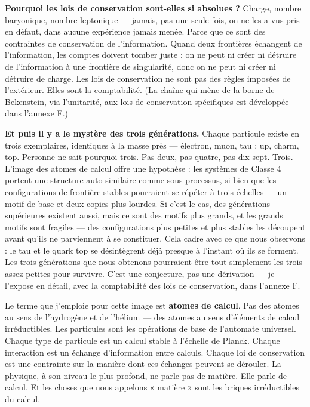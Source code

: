 \documentclass[11pt, twoside, openright]{book}
\begin{document}
\textbf{Pourquoi les lois de conservation sont-elles si absolues ?} Charge, nombre baryonique, nombre leptonique --- jamais, pas une seule fois, on ne les a vus pris en défaut, dans aucune expérience jamais menée. Parce que ce sont des contraintes de conservation de l'information. Quand deux frontières échangent de l'information, les comptes doivent tomber juste : on ne peut ni créer ni détruire de l'information à une frontière de singularité, donc on ne peut ni créer ni détruire de charge. Les lois de conservation ne sont pas des règles imposées de l'extérieur. Elles sont la comptabilité. (La chaîne qui mène de la borne de Bekenstein, via l'unitarité, aux lois de conservation spécifiques est développée dans l'annexe F.)

\textbf{Et puis il y a le mystère des trois générations.} Chaque particule existe en trois exemplaires, identiques à la masse près --- électron, muon, tau ; up, charm, top. Personne ne sait pourquoi trois. Pas deux, pas quatre, pas dix-sept. Trois. L'image des atomes de calcul offre une hypothèse : les systèmes de Classe 4 portent une structure auto-similaire comme sous-processus, si bien que les configurations de frontière stables pourraient se répéter à trois échelles --- un motif de base et deux copies plus lourdes. Si c'est le cas, des générations supérieures existent aussi, mais ce sont des motifs plus grands, et les grands motifs sont fragiles --- des configurations plus petites et plus stables les découpent avant qu'ils ne parviennent à se constituer. Cela cadre avec ce que nous observons : le tau et le quark top se désintègrent déjà presque à l'instant où ils se forment. Les trois générations que nous obtenons pourraient être tout simplement les trois assez petites pour survivre. C'est une conjecture, pas une dérivation --- je l'expose en détail, avec la comptabilité des lois de conservation, dans l'annexe F.

Le terme que j'emploie pour cette image est \textbf{atomes de calcul}. Pas des atomes au sens de l'hydrogène et de l'hélium --- des atomes au sens d'éléments de calcul irréductibles. Les particules sont les opérations de base de l'automate universel. Chaque type de particule est un calcul stable à l'échelle de Planck. Chaque interaction est un échange d'information entre calculs. Chaque loi de conservation est une contrainte sur la manière dont ces échanges peuvent se dérouler. La physique, à son niveau le plus profond, ne parle pas de matière. Elle parle de calcul. Et les choses que nous appelons « matière » sont les briques irréductibles du calcul.
\end{document}
